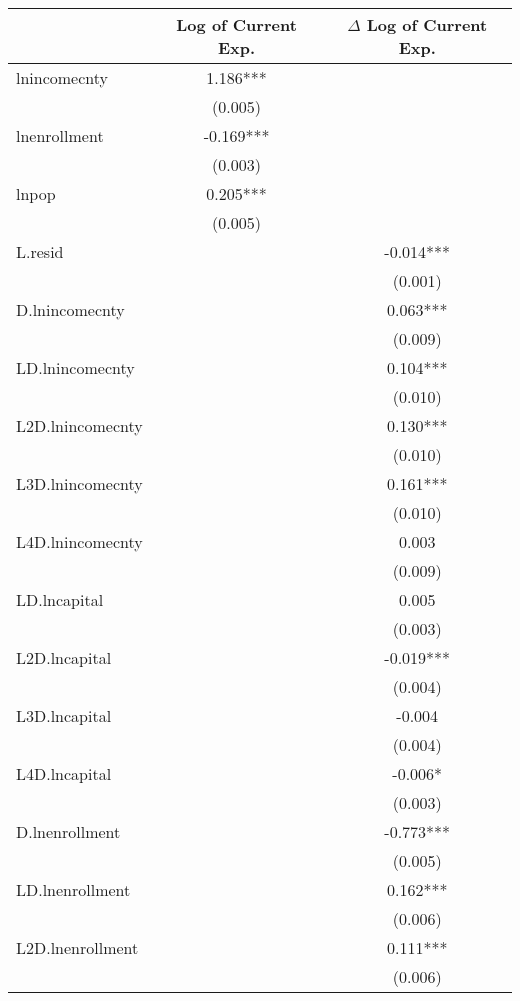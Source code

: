 \begin{tabular}{lcc}
\hline
 & Log of Current Exp. & $\Delta$ Log of Current Exp. \\ 
\hline
lnincomecnty        & 1.186*** &  \\
                    & (0.005)  &  \\
lnenrollment        & -0.169*** &  \\
                    & (0.003)  &  \\
lnpop               & 0.205*** &  \\
                    & (0.005)  &  \\
L.resid             &  & -0.014*** \\
                    &  & (0.001) \\
D.lnincomecnty      &  & 0.063*** \\
                    &  & (0.009) \\
LD.lnincomecnty     &  & 0.104*** \\
                    &  & (0.010) \\
L2D.lnincomecnty    &  & 0.130*** \\
                    &  & (0.010) \\
L3D.lnincomecnty    &  & 0.161*** \\
                    &  & (0.010) \\
L4D.lnincomecnty    &  & 0.003 \\
                    &  & (0.009) \\
LD.lncapital        &  & 0.005 \\
                    &  & (0.003) \\
L2D.lncapital       &  & -0.019*** \\
                    &  & (0.004) \\
L3D.lncapital       &  & -0.004 \\
                    &  & (0.004) \\
L4D.lncapital       &  & -0.006* \\
                    &  & (0.003) \\
D.lnenrollment      &  & -0.773*** \\
                    &  & (0.005) \\
LD.lnenrollment     &  & 0.162*** \\
                    &  & (0.006) \\
L2D.lnenrollment    &  & 0.111*** \\
                    &  & (0.006) \\

\end{tabular}
